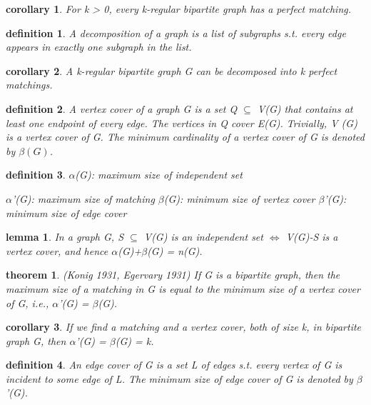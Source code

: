 \documentclass[twocolumn]{article}
\newtheorem{theorem}{theorem}[section]  %
\newtheorem{definition}{definition}
\newtheorem{lemma}{lemma}
\newtheorem{corollary}{corollary}
\begin{document}
\begin{CJK*}{UTF8}{bkai}
    \begin{corollary}
         For k > 0, every k-regular bipartite graph has a perfect matching.
    \end{corollary}

    \begin{definition}
         A decomposition of a graph is a list of subgraphs s.t. every edge appears in
 exactly one subgraph in the list.
    \end{definition}

    \begin{corollary}
        A k-regular bipartite graph G can be decomposed into k perfect matchings.
    \end{corollary}

    \begin{definition}
        A vertex cover of a graph G is a set Q $\subseteq$ V(G) that contains at least one
 endpoint of every edge. The vertices in Q cover E(G).
 Trivially, V (G) is a vertex cover of G. The minimum cardinality of a vertex
 cover of G is denoted by $\beta(G)$.
    \end{definition}

    \begin{definition}
        $\alpha$(G): maximum size of independent set

 $\alpha$'(G): maximum size of matching
 $\beta$(G): minimum size of vertex cover
 $\beta$'(G): minimum size of edge cover
    \end{definition}

    \begin{lemma}
        In a graph G, S $\subseteq$ V(G) is an independent set $\iff$ V(G)-S is a vertex cover,
 and hence $\alpha$(G)+$\beta$(G) = n(G).
    \end{lemma}

    \begin{theorem}{(Konig 1931, Egervary 1931)}
        If G is a bipartite graph, then the maximum size of a matching in G is equal
 to the minimum size of a vertex cover of G, i.e., $\alpha$'(G) = $\beta$(G).
    \end{theorem}

    \begin{corollary}
         If we find a matching and a vertex cover, both of size k, in bipartite graph G,
 then $\alpha$'(G) = $\beta$(G) = k.
    \end{corollary}

    \begin{definition}
        An edge cover of G is a set L of edges s.t. every vertex of G is incident to
 some edge of L.
 The minimum size of edge cover of G is denoted by $\beta$'(G).
    \end{definition}


\end{CJK*}
\end{document}

